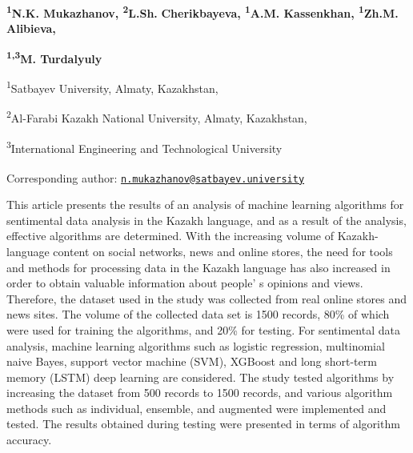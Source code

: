 
\begin{articleheader}

{\bfseries \textsuperscript{1}N.K. Mukazhanov\textsuperscript{\envelope },
\textsuperscript{2}L.Sh.} {\bfseries Cherikbayeva, \textsuperscript{1}A.M.
Kassenkhan, \textsuperscript{1}Zh.M. Alibieva,}

{\bfseries \textsuperscript{1,3}M. Turdalyuly}
\end{articleheader}

\begin{affiliation}
\textsuperscript{1}Satbayev University, Almaty, Kazakhstan,

\textsuperscript{2}Al-Farabi Kazakh National University, Almaty,
Kazakhstan,

\textsuperscript{3}International Engineering and Technological
University

\raggedright {\bfseries \textsuperscript{\envelope }}Corresponding author: \href{mailto:n.mukazhanov@satbayev.university}{\nolinkurl{n.mukazhanov@satbayev.university}}
\end{affiliation}

This article presents the results of an analysis of machine learning
algorithms for sentimental data analysis in the Kazakh language, and as
a result of the analysis, effective algorithms are determined. With the
increasing volume of Kazakh-language content on social networks, news
and online stores, the need for tools and methods for processing data in
the Kazakh language has also increased in order to obtain valuable
information about people' s opinions and views.
Therefore, the dataset used in the study was collected from real online
stores and news sites. The volume of the collected data set is 1500
records, 80\% of which were used for training the algorithms, and 20\%
for testing. For sentimental data analysis, machine learning algorithms
such as logistic regression, multinomial naive Bayes, support vector
machine (SVM), XGBoost and long short-term memory (LSTM) deep learning
are considered. The study tested algorithms by increasing the dataset
from 500 records to 1500 records, and various algorithm methods such as
individual, ensemble, and augmented were implemented and tested. The
results obtained during testing were presented in terms of algorithm
accuracy.


